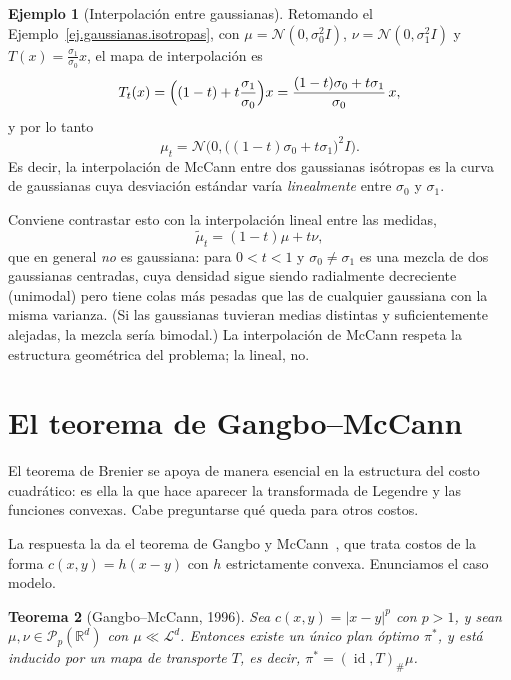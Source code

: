 \documentclass[12pt, a4paper]{amsbook}
\newcommand{\id}{\operatorname{id}}
\newcommand{\R}{{\mathbb R}}
\newtheorem{teo}{Teorema}[section]
\theoremstyle{remark}
\theoremstyle{definition}
\newtheorem{ejem}[teo]{Ejemplo}
\numberwithin{section}{chapter}
\numberwithin{subsection}{section}
\numberwithin{equation}{section}
\numberwithin{figure}{chapter}
\begin{document}
\begin{ejem}[Interpolación entre gaussianas]\label{ej.interpolacion.gaussianas}
Retomando el Ejemplo~\ref{ej.gaussianas.isotropas}, con
$\mu=\mathcal N(0,\sigma_0^2I)$, $\nu=\mathcal N(0,\sigma_1^2I)$ y
$T(x)=\tfrac{\sigma_1}{\sigma_0}x$, el mapa de interpolación es
\[
T_t(x)
=
\Bigl((1-t)+t\frac{\sigma_1}{\sigma_0}\Bigr)x
=
\frac{(1-t)\sigma_0+t\sigma_1}{\sigma_0}\,x,
\]
y por lo tanto
\[
\mu_t=\mathcal N\bigl(0,\bigl((1-t)\sigma_0+t\sigma_1\bigr)^2I\bigr).
\]
Es decir, la interpolación de McCann entre dos gaussianas isótropas es la curva
de gaussianas cuya desviación estándar varía \emph{linealmente} entre $\sigma_0$
y $\sigma_1$.

Conviene contrastar esto con la interpolación lineal entre las medidas,
\[
\widetilde\mu_t=(1-t)\mu+t\nu,
\]
que en general \emph{no} es gaussiana: para $0<t<1$ y $\sigma_0\ne\sigma_1$
es una mezcla de dos gaussianas centradas, cuya densidad sigue siendo
radialmente decreciente (unimodal) pero tiene colas más pesadas que las de
cualquier gaussiana con la misma varianza. (Si las gaussianas tuvieran medias
distintas y suficientemente alejadas, la mezcla sería bimodal.) La interpolación de McCann respeta la estructura geométrica del
problema; la lineal, no.
\end{ejem}

\section{El teorema de Gangbo--McCann}\label{sec.Gangbo.McCann}

El teorema de Brenier se apoya de manera esencial en la estructura del costo
cuadrático: es ella la que hace aparecer la transformada de Legendre y las
funciones convexas. Cabe preguntarse qué queda para otros costos.

La respuesta la da el teorema de Gangbo y McCann~\cite{GangboMcCann1996}, que
trata costos de la forma $c(x,y)=h(x-y)$ con $h$ estrictamente convexa.
Enunciamos el caso modelo.

\begin{teo}[Gangbo--McCann, 1996]\label{teo.Gangbo.McCann}
Sea $c(x,y)=|x-y|^p$ con $p>1$, y sean $\mu,\nu\in\mathcal P_p(\R^d)$ con
$\mu\ll\mathcal L^d$. Entonces existe un único plan óptimo $\pi^*$, y está
inducido por un mapa de transporte $T$, es decir, $\pi^*=(\id,T)_\#\mu$.
\end{teo}
\end{document}
